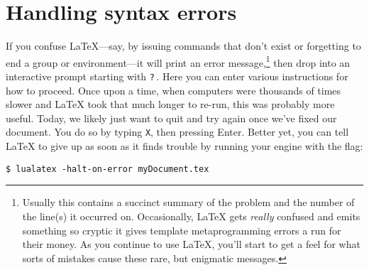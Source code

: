 \section{Handling syntax errors}
If you confuse \LaTeX{}---say, by issuing commands that don't exist or
forgetting to end a group or environment---it will print an
error message,\punckern\footnote{Usually this contains a succinct summary of
the problem and the number of the line(s) it occurred on. Occasionally,
\LaTeX{} gets \emph{really} confused and emits something so cryptic it gives
\cpp{} template metaprogramming errors a run for their money.
As you continue to use \LaTeX, you'll start to get a feel for what sorts of
mistakes cause these rare, but enigmatic messages.}
then drop into an interactive prompt starting with \texttt{?}\,.
Here you can enter various instructions for how to proceed.
Once upon a time, when computers were thousands of times slower and
\LaTeX{} took that much longer to re-run, this was probably more useful.
Today, we likely just want to quit and try again once we've fixed our document.
You do so by typing \texttt{X}, then pressing Enter.
Better yet, you can tell \LaTeX{} to give up as soon as it finds trouble
by running your engine with the  flag:
\begin{leftfigure}
\begin{lstlisting}
$ lualatex -halt-on-error myDocument.tex
\end{lstlisting}
\end{leftfigure}
